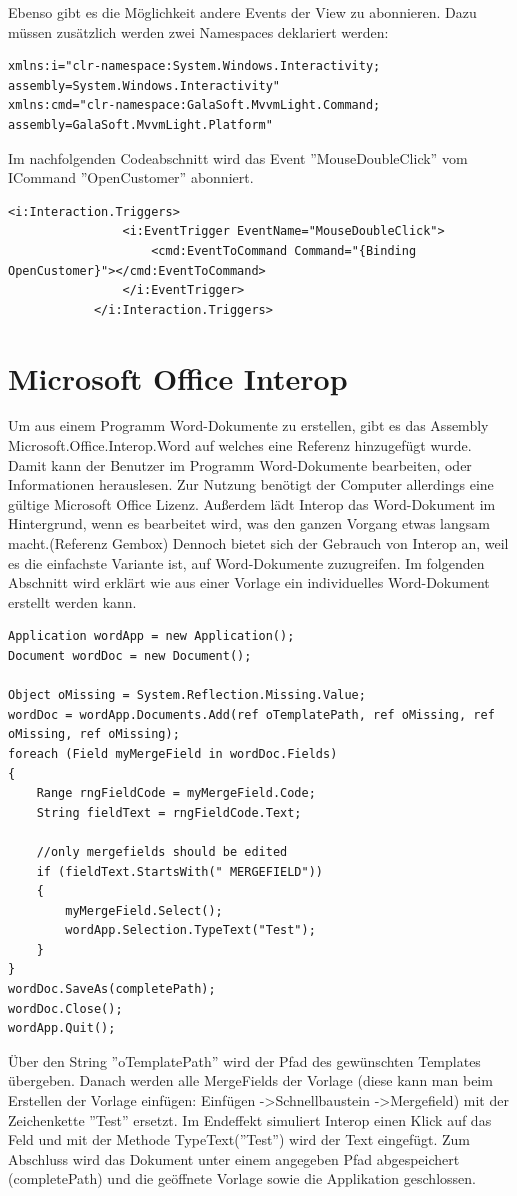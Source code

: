 Ebenso gibt es die Möglichkeit andere Events der View zu abonnieren. Dazu müssen zusätzlich werden zwei Namespaces deklariert werden:
\begin{lstlisting}
xmlns:i="clr-namespace:System.Windows.Interactivity;
assembly=System.Windows.Interactivity"
xmlns:cmd="clr-namespace:GalaSoft.MvvmLight.Command;
assembly=GalaSoft.MvvmLight.Platform"
\end{lstlisting}
Im nachfolgenden Codeabschnitt wird das Event ''MouseDoubleClick'' vom ICommand ''OpenCustomer'' abonniert.
\begin{lstlisting}
<i:Interaction.Triggers>
                <i:EventTrigger EventName="MouseDoubleClick">
                    <cmd:EventToCommand Command="{Binding OpenCustomer}"></cmd:EventToCommand>
                </i:EventTrigger>
            </i:Interaction.Triggers>
\end{lstlisting}
\section{Microsoft Office Interop}
Um aus einem Programm Word-Dokumente zu erstellen, gibt es das Assembly Microsoft.Office.Interop.Word auf welches eine Referenz hinzugefügt wurde. Damit kann der Benutzer im Programm Word-Dokumente bearbeiten, oder Informationen herauslesen. Zur Nutzung benötigt der Computer allerdings eine gültige Microsoft Office Lizenz.  Außerdem lädt Interop das Word-Dokument im Hintergrund, wenn es bearbeitet wird, was den ganzen Vorgang etwas langsam macht.(Referenz Gembox)
Dennoch bietet sich der Gebrauch von Interop an, weil es die einfachste Variante ist, auf Word-Dokumente zuzugreifen.
Im folgenden Abschnitt wird erklärt wie aus einer Vorlage ein individuelles Word-Dokument erstellt werden kann.
\begin{lstlisting}
Application wordApp = new Application();
Document wordDoc = new Document();

Object oMissing = System.Reflection.Missing.Value;
wordDoc = wordApp.Documents.Add(ref oTemplatePath, ref oMissing, ref oMissing, ref oMissing);
foreach (Field myMergeField in wordDoc.Fields)
{
	Range rngFieldCode = myMergeField.Code;
	String fieldText = rngFieldCode.Text;

	//only mergefields should be edited
	if (fieldText.StartsWith(" MERGEFIELD"))
	{
		myMergeField.Select();
		wordApp.Selection.TypeText("Test");
	}
}
wordDoc.SaveAs(completePath);
wordDoc.Close();
wordApp.Quit();
\end{lstlisting}
Über den String ''oTemplatePath'' wird der Pfad des gewünschten Templates übergeben. Danach werden alle MergeFields der Vorlage (diese kann man beim Erstellen der Vorlage einfügen: Einfügen -\textgreater Schnellbaustein -\textgreater Mergefield) mit der Zeichenkette ''Test'' ersetzt. Im Endeffekt simuliert Interop einen Klick auf das Feld und mit der Methode TypeText(''Test'') wird der Text eingefügt. Zum Abschluss wird das Dokument unter einem angegeben Pfad abgespeichert (completePath) und die geöffnete Vorlage sowie die Applikation geschlossen.
